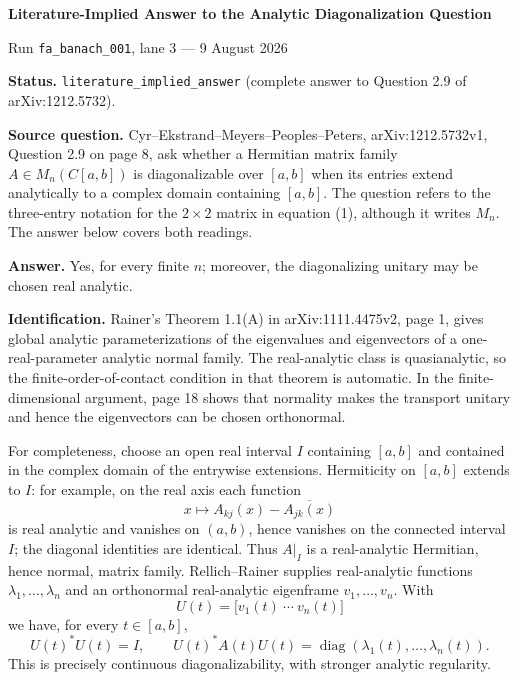 \documentclass[10pt]{article}
\begin{document}
\begin{center}
  {\Large\bfseries Literature-Implied Answer to the Analytic Diagonalization Question}\par
  \vspace{0.45em}
  {Run \texttt{fa\_banach\_001}, lane 3 --- 9 August 2026}
\end{center}
\vspace{0.3em}

\textbf{Status.} \texttt{literature\_implied\_answer} (complete answer to
Question 2.9 of arXiv:1212.5732).

\textbf{Source question.} Cyr--Ekstrand--Meyers--Peoples--Peters,
arXiv:1212.5732v1, Question 2.9 on page 8, ask whether a Hermitian
matrix family $A\in M_n(C[a,b])$ is diagonalizable over $[a,b]$ when its
entries extend analytically to a complex domain containing $[a,b]$.
The question refers to the three-entry notation for the $2\times2$ matrix in
equation (1), although it writes $M_n$.  The answer below covers both readings.

\textbf{Answer.} Yes, for every finite $n$; moreover, the diagonalizing
unitary may be chosen real analytic.

\textbf{Identification.} Rainer's Theorem 1.1(A) in
arXiv:1111.4475v2, page 1, gives global analytic parameterizations of the
eigenvalues and eigenvectors of a one-real-parameter analytic normal family.
The real-analytic class is quasianalytic, so the finite-order-of-contact
condition in that theorem is automatic.  In the finite-dimensional argument,
page 18 shows that normality makes the transport unitary and hence the
eigenvectors can be chosen orthonormal.

For completeness, choose an open real interval $I$ containing $[a,b]$ and
contained in the complex domain of the entrywise extensions.  Hermiticity on
$[a,b]$ extends to $I$: for example, on the real axis each function
\[
  x\longmapsto A_{kj}(x)-\overline{A_{jk}(x)}
\]
is real analytic and vanishes on $(a,b)$, hence vanishes on the connected
interval $I$; the diagonal identities are identical.  Thus $A|_I$ is a
real-analytic Hermitian, hence normal, matrix family.  Rellich--Rainer supplies
real-analytic functions $\lambda_1,\ldots,\lambda_n$ and an orthonormal
real-analytic eigenframe $v_1,\ldots,v_n$.  With
\[
  U(t)=\bigl[v_1(t)\ \cdots\ v_n(t)\bigr]
\]
we have, for every $t\in[a,b]$,
\[
  U(t)^*U(t)=I,
  \qquad
  U(t)^*A(t)U(t)=\operatorname{diag}
     (\lambda_1(t),\ldots,\lambda_n(t)).
\]
This is precisely continuous diagonalizability, with stronger analytic
regularity.
\end{document}
